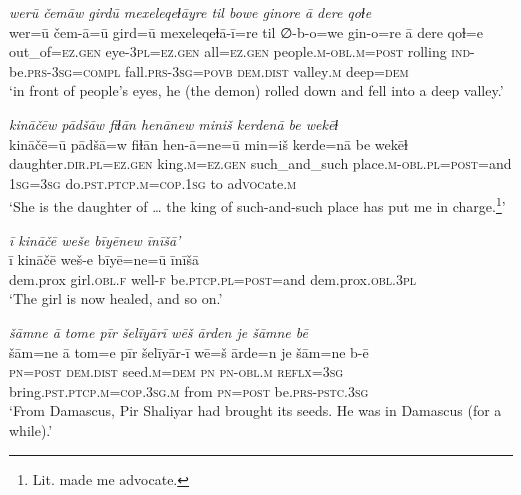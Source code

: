 \ea \label{ZP.80}
\textit{werū čemāw girdū mexeleqeɫāyre til bowe ginore ā dere qoɫe} \\ 
\gll wer=ū čem-ā=ū gird=ū mexeleqeɫā-ī=re til ∅-b-o=we gin-o=re ā dere qoɫ=e \\ 
 out\_of\textsc{\textsc{=ez.gen}} eye\textsc{-3pl}\textsc{\textsc{=ez.gen}} all\textsc{\textsc{=ez.gen}} people\textsc{.m}\textsc{-obl}\textsc{.m}\textsc{=\textsc{post}} rolling \textsc{ind-}be\textsc{.prs}\textsc{-3sg}\textsc{=compl} fall\textsc{.prs}\textsc{-3sg}\textsc{=\textsc{povb}} \textsc{dem.dist} valley\textsc{.m} deep\textsc{=dem} \\ 
\glt `in front of people’s eyes, he (the demon) rolled down and fell into a deep valley.'
\z 
 
\ea \label{ZP.89}
\textit{kināčēw pādšāw fiɫān henānew miniš kerdenā be wekēɫ} \\ 
\gll kināčē=ū pādšā=w fiɫān hen-ā=ne=ū min=iš kerde=nā be wekēɫ \\ 
 daughter\textsc{.dir}\textsc{.pl}\textsc{\textsc{=ez.gen}} king\textsc{.m}\textsc{\textsc{=ez.gen}} such\_and\_such place\textsc{.m}\textsc{-obl}\textsc{.pl}\textsc{=\textsc{post}}=and \textsc{1sg}\textsc{=3sg} do\textsc{.pst}\textsc{.ptcp}\textsc{.m}\textsc{=cop}\textsc{.\textsc{1sg}} to ad\textsc{voc}ate\textsc{.m} \\ 
\glt `She is the daughter of … the king of such-and-such place has put me in charge.\footnote{Lit. made me advocate.}'
\z 
 
\ea \label{ZP.91}
\textit{ī kināčē weše bīyēnew īnīšā’} \\ 
\gll ī kināčē weš-e bīyē=ne=ū īnīšā \\ 
 dem.prox girl\textsc{.obl}\textsc{.f} well\textsc{-f} be\textsc{.ptcp}\textsc{.pl}\textsc{=\textsc{post}}=and dem.prox\textsc{.obl}\textsc{.3pl} \\ 
\glt `The girl is now healed, and so on.'
\z 
 
\ea \label{ZP.95}
\textit{šāmne ā tome pīr šelīyārī wēš ārden je šāmne bē} \\ 
\gll šām=ne ā tom=e pīr šelīyār-ī wē=š ārde=n je šām=ne b-ē \\ 
 \textsc{pn}\textsc{=\textsc{post}} \textsc{dem.dist} seed\textsc{.m}\textsc{=dem} \textsc{pn} \textsc{pn}\textsc{-obl}\textsc{.m} \textsc{reflx}\textsc{=3sg} bring\textsc{.pst}\textsc{.ptcp}\textsc{.m}\textsc{=cop}\textsc{.3sg}\textsc{.m} from \textsc{pn}\textsc{=\textsc{post}} be\textsc{.prs}\textsc{-pstc}\textsc{.3sg} \\ 
\glt `From Damascus, Pir Shaliyar had brought its seeds. He was in Damascus (for a while).'
\z 
 
